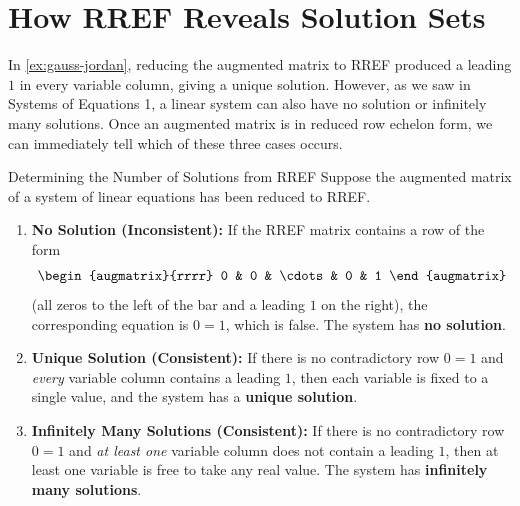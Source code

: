 \documentclass{article}
\begin{document}
\section{How RREF Reveals Solution Sets}\label{sec:RREF-solution-sets}

In \cref{ex:gauss-jordan}, reducing the augmented matrix to RREF produced a leading \(1\) in every variable column, giving a unique solution. However, as we saw in Systems of Equations 1, a linear system can also have no solution or infinitely many solutions. Once an augmented matrix is in reduced row echelon form, we can immediately tell which of these three cases occurs.

\begin{calloutbox}{Determining the Number of Solutions from RREF}
Suppose the augmented matrix of a system of linear equations has been reduced to RREF.
\begin{enumerate}
    \item \textbf{No Solution (Inconsistent):} If the RREF matrix contains a row of the form
    \[
    \begin{augmatrix}{rrrr} 0 & 0 & \cdots & 0 & 1 \end{augmatrix}
    \]
    (all zeros to the left of the bar and a leading \(1\) on the right), the corresponding equation is \(0 = 1\), which is false. The system has \textbf{no solution}.
    \item \textbf{Unique Solution (Consistent):} If there is no contradictory row \(0 = 1\) and \emph{every} variable column contains a leading \(1\), then each variable is fixed to a single value, and the system has a \textbf{unique solution}.
    \item \textbf{Infinitely Many Solutions (Consistent):} If there is no contradictory row \(0 = 1\) and \emph{at least one} variable column does not contain a leading \(1\), then at least one variable is free to take any real value. The system has \textbf{infinitely many solutions}.
\end{enumerate}
\end{calloutbox}
\end{document}
